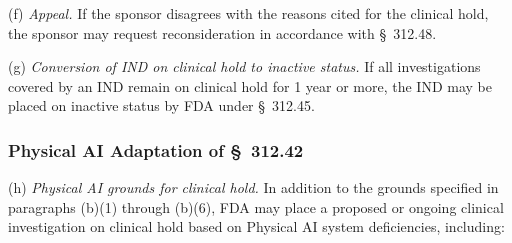 \documentclass[11pt]{article}
\begin{document}
(f) \textit{Appeal.} If the sponsor disagrees with the reasons cited for the clinical hold, the sponsor may request reconsideration in accordance with \S~312.48.

(g) \textit{Conversion of IND on clinical hold to inactive status.} If all investigations covered by an IND remain on clinical hold for 1 year or more, the IND may be placed on inactive status by FDA under \S~312.45.

\subsubsection{Physical AI Adaptation of \S~312.42}

(h) \textit{Physical AI grounds for clinical hold.} In addition to the grounds specified in paragraphs (b)(1) through (b)(6), FDA may place a proposed or ongoing clinical investigation on clinical hold based on Physical AI system deficiencies, including:
\end{document}
